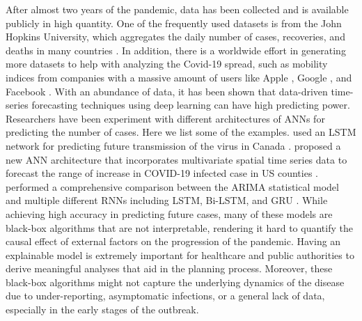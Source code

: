After almost two years of the pandemic, data has been collected and is available publicly in high quantity.
One of the frequently used datasets is from the John Hopkins University, which aggregates the daily number of cases, recoveries, and deaths in many countries \cite{dongInteractiveWebbasedDashboard2020}.
In addition, there is a worldwide effort in generating more datasets to help with analyzing the Covid-19 spread, such as mobility indices from companies with a massive amount of users like Apple \cite{COVID19Mobility}, Google \cite{COVID19Mobility}, and Facebook \cite{DataGoodTools}.
With an abundance of data, it has been shown that data-driven time-series forecasting techniques using deep learning can have high predicting power.
Researchers have been experiment with different architectures of \glspl{ANN} \cite{hecht-nielsenTheoryBackpropagationNeural} for predicting the number of cases.
Here we list some of the examples.
\citeauthor{chimmulaTimeSeriesForecasting2020} used an \gls{LSTM} network for predicting future transmission of the virus in Canada \cite{chimmulaTimeSeriesForecasting2020}.
\citeauthor{ramchandaniDeepCOVIDNetInterpretableDeep2020} proposed a new \gls{ANN} architecture that incorporates multivariate spatial time series data to forecast the range of increase in COVID-19 infected case in \gls{US} counties \cite{ramchandaniDeepCOVIDNetInterpretableDeep2020}.
\citeauthor{shahidPredictionsCOVID19Deep2020} performed a comprehensive comparison between the \gls{ARIMA} statistical model and multiple different \glspl{RNN} including \gls{LSTM}, \gls{Bi-LSTM}, and \gls{GRU} \cite{shahidPredictionsCOVID19Deep2020}.
While achieving high accuracy in predicting future cases, many of these models are black-box algorithms that are not interpretable, rendering it hard to quantify the causal effect of external factors on the progression of the pandemic.
Having an explainable model is extremely important for healthcare and public authorities to derive meaningful analyses that aid in the planning process.
Moreover, these black-box algorithms might not capture the underlying dynamics of the disease due to under-reporting, asymptomatic infections, or a general lack of data, especially in the early stages of the outbreak.

